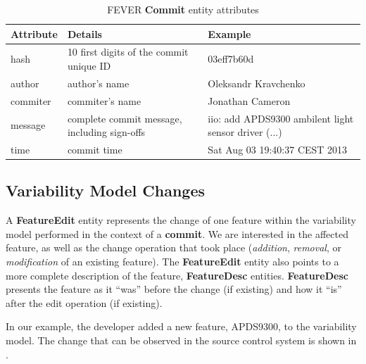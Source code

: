\begin{table}[h]
\centering
\resizebox{\textwidth}{!}
{
\begin{tabular}{|l|l|l|}
\hline
Attribute 		& Details 										& Example\\
\hline
hash			& 10 first digits of the commit unique ID 		& 03eff7b60d \\
\hline
author			& author's name 								& Oleksandr Kravchenko\\
\hline
commiter 		& commiter's name 								& Jonathan Cameron\\
\hline
message 		& complete commit message, including sign-offs 	& iio: add APDS9300 ambilent light sensor driver (...)\\
\hline
time			& commit time 									& Sat Aug 03 19:40:37 CEST 2013\\
\hline
\end{tabular}
}
\caption{FEVER \textbf{Commit} entity attributes }
\label{commit_attrs}
\end{table}

\subsection{Variability Model Changes}

A \textbf{FeatureEdit} entity represents the change of one feature within the variability model performed in the context of a \textbf{commit}.
We are interested in the affected feature, as well as the change operation that took place (\textit{addition}, \textit{removal}, or \textit{modification} of an existing feature).
The \textbf{FeatureEdit} entity also points to a more complete description of the feature, \textbf{FeatureDesc} entities. 
\textbf{FeatureDesc} presents the feature as it ``was'' before the change (if existing)  and how it ``is'' after the edit operation (if existing).

In our example, the developer added a new feature, APDS9300, to the variability model.
The change that can be observed in the source control system is shown in .

